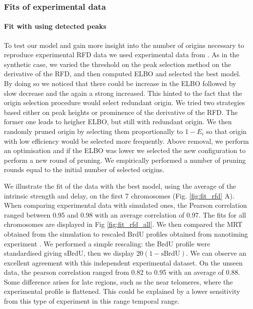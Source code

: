 \documentclass[10pt,a4paper]{revtex4-2}
\begin{document}
\subsubsection{Fits of experimental data}


\paragraph{Fit with using detected peaks}

To test our model and gain more insight into the number of origins necessary to reproduce experimental RFD data we used experimental data from \cite{Theulot2022}. As in the synthetic case, we varied the threshold on the peak selection method on the derivative of the RFD, and then computed ELBO and selected the best model.
By doing so we noticed that there could be increase in the ELBO followed by slow decrease and the again a strong increased. This hinted to the fact that the origin selection procedure would select redundant origin. 
We tried two strategies based either on peak heights or prominence of the derivative of the RFD. The former one leads to heigher ELBO, but still with redundant origin. We then randomly pruned origin by selecting them proportionally to $1-E_i$ so that origin with low efficiency would be selected more frequently. 
Above removal, we perform an optimisation and if the ELBO was lower we selected the new configuration to perform 
a new round of pruning. 
We empirically performed a number of pruning rounds equal to the initial number of selected origins.

We illustrate the fit of the data with the best model, 
using the average of the intrinsic strength and delay, 
on the first 7 chromosomes (Fig. \ref{fig:fit_rfd} A). 
When comparing experimental data with simulated ones, 
the Pearson correlation ranged between 0.95 and 0.98 with an average correlation of 0.97. 
The fits for all chromosomes are displayed in Fig \ref{fig:fit_rfd_all}. 
We then compared the MRT obtained from the simulation to rescaled BrdU profiles obtained from nanotiming 
experiment \cite{Theulot2025}. We performed a simple rescaling: the BrdU profile 
were standardised giving sBrdU, then we display $20(1-\text{sBrdU})$. 
We can observe an excellent agreement with this independent experimental dataset. On the unseen data, the pearson correlation ranged
from 0.82 to 0.95 with an average of 0.88. 
Some difference arises for late regions, such as the near telomeres, 
where the experimental profile is flattened. This could be explained by a lower sensitivity from this type of experiment 
in this range temporal range.
\end{document}
